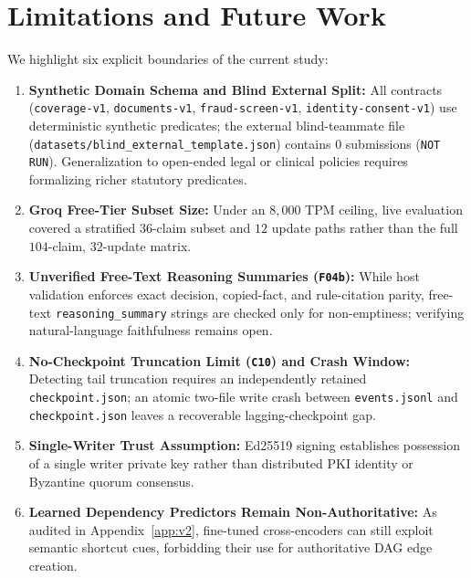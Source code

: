 \documentclass[11pt,a4paper]{article}
\begin{document}
\section{Limitations and Future Work}
We highlight six explicit boundaries of the current study:
\begin{enumerate}[leftmargin=*,itemsep=2pt]
    \item \textbf{Synthetic Domain Schema and Blind External Split:} All contracts (\texttt{coverage-v1}, \texttt{documents-v1}, \texttt{fraud-screen-v1}, \texttt{identity-consent-v1}) use deterministic synthetic predicates; the external blind-teammate file (\texttt{datasets/blind\_external\_template.json}) contains $0$ submissions (\texttt{NOT RUN}). Generalization to open-ended legal or clinical policies requires formalizing richer statutory predicates.
    \item \textbf{Groq Free-Tier Subset Size:} Under an $8{,}000$ TPM ceiling, live evaluation covered a stratified $36$-claim subset and $12$ update paths rather than the full $104$-claim, $32$-update matrix.
    \item \textbf{Unverified Free-Text Reasoning Summaries (\texttt{F04b}):} While host validation enforces exact decision, copied-fact, and rule-citation parity, free-text \texttt{reasoning\_summary} strings are checked only for non-emptiness; verifying natural-language faithfulness remains open.
    \item \textbf{No-Checkpoint Truncation Limit (\texttt{C10}) and Crash Window:} Detecting tail truncation requires an independently retained \texttt{checkpoint.json}; an atomic two-file write crash between \texttt{events.jsonl} and \texttt{checkpoint.json} leaves a recoverable lagging-checkpoint gap.
    \item \textbf{Single-Writer Trust Assumption:} Ed25519 signing establishes possession of a single writer private key rather than distributed PKI identity or Byzantine quorum consensus.
    \item \textbf{Learned Dependency Predictors Remain Non-Authoritative:} As audited in Appendix~\ref{app:v2}, fine-tuned cross-encoders can still exploit semantic shortcut cues, forbidding their use for authoritative DAG edge creation.
\end{enumerate}
\end{document}
